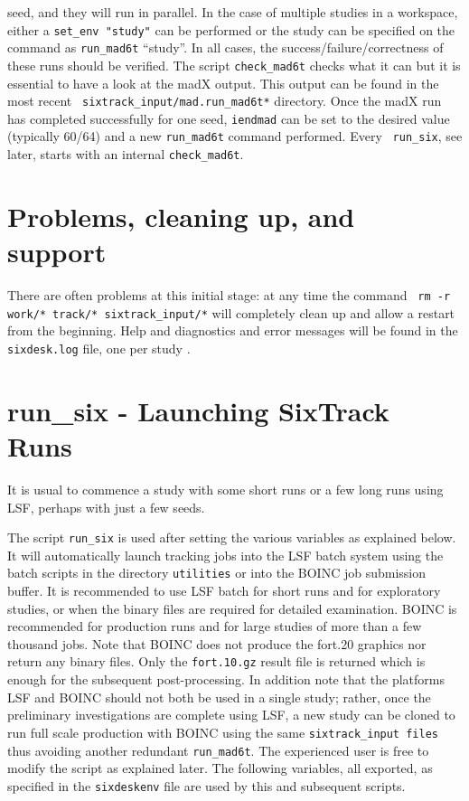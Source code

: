 \documentclass{cernatsnote}
\begin{document}
seed, and they will run in parallel.  In the case of multiple studies in a
workspace, either a {\tt set\_env "study"} can be performed or the study can
be specified on the command as \texttt{run\_mad6t} ``study''.  In all cases,
the success/failure/correctness of these runs should be verified.  The script
\texttt{check\_mad6t} checks what it can but it is essential to have a look at
the madX output. This output can be found in the most recent {\tt
sixtrack\_input/mad.run\_mad6t*} directory.  Once the madX run has completed
successfully for one seed, \texttt{iendmad} can be set to the desired value
(typically 60/64) and a new \texttt{run\_mad6t} command performed. Every {\tt
run\_six}, see later, starts with an internal \texttt{check\_mad6t}.

\section{Problems, cleaning up, and support}

There are often problems at this initial stage: at any time the command {\tt
rm -r work/* track/* sixtrack\_input/*} will completely clean up and allow a
restart from the beginning. Help and diagnostics and error messages will be
found in the \texttt{sixdesk.log} file, one per study \footnotemark.

\section{run\_six - Launching SixTrack Runs}
%
\label{sec:run_six}
It is usual to commence a study with some short runs or a few long runs using
LSF, perhaps with just a few seeds.

The script \texttt{run\_six} is used after setting the various variables as
explained below.  It will automatically launch tracking jobs into the LSF
batch system using the batch scripts in the directory \texttt{utilities} or
into the BOINC job submission buffer.  It is recommended to use LSF batch for
short runs and for exploratory studies, or when the binary files are required
for detailed examination.  BOINC is recommended for production runs and for
large studies of more than a few thousand jobs. Note that BOINC does not
produce the fort.20 graphics nor return any binary files. Only the
\texttt{fort.10.gz}  result file is returned which is enough for the
subsequent post-processing.  In addition note that the platforms LSF and BOINC
should not both be used in a single study; rather, once the preliminary
investigations are complete using LSF, a new study can be cloned to run full
scale production with BOINC using the same {\tt sixtrack\_input files} thus
avoiding another redundant \texttt{run\_mad6t}.  The experienced user is free
to modify the script as explained later.  The following variables, all
exported, as specified in the \texttt{sixdeskenv} file are used by this and
subsequent scripts.
\end{document}
